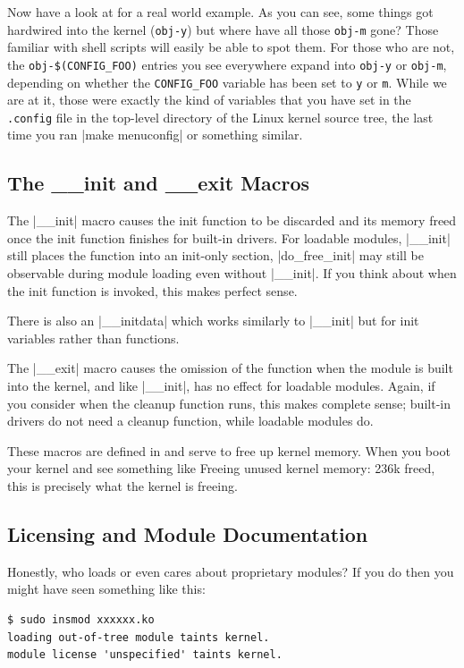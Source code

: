 \documentclass[10pt, oneside]{book}
\begin{document}
Now have a look at  for a real world example.
As you can see, some things got hardwired into the kernel (\verb|obj-y|) but where have all those \verb|obj-m| gone?
Those familiar with shell scripts will easily be able to spot them.
For those who are not, the \verb|obj-$(CONFIG_FOO)| entries you see everywhere expand into \verb|obj-y| or \verb|obj-m|,
depending on whether the \verb|CONFIG_FOO| variable has been set to \verb|y| or \verb|m|.
While we are at it, those were exactly the kind of variables that you have set in the \verb|.config| file in the top-level directory of the Linux kernel source tree,
the last time you ran \sh|make menuconfig| or something similar.

\subsection{The \_\_init and \_\_exit Macros}
\label{sec:init_n_exit}
The \cpp|__init| macro causes the init function to be discarded and its memory freed once the init function finishes for built-in drivers.
For loadable modules, \cpp|__init| still places the function into an init-only section, \cpp|do_free_init| may still be observable during module loading even without \cpp|__init|.
If you think about when the init function is invoked, this makes perfect sense.

There is also an \cpp|__initdata| which works similarly to \cpp|__init| but for init variables rather than functions.

The \cpp|__exit| macro causes the omission of the function when the module is built into the kernel, and like \cpp|__init|, has no effect for loadable modules.
Again, if you consider when the cleanup function runs, this makes complete sense; built-in drivers do not need a cleanup function, while loadable modules do.

These macros are defined in  and serve to free up kernel memory.
When you boot your kernel and see something like Freeing unused kernel memory: 236k freed, this is precisely what the kernel is freeing.


\subsection{Licensing and Module Documentation}
\label{sec:modlicense}
Honestly, who loads or even cares about proprietary modules?
If you do then you might have seen something like this:
\begin{verbatim}
$ sudo insmod xxxxxx.ko
loading out-of-tree module taints kernel.
module license 'unspecified' taints kernel.
\end{verbatim}
\end{document}
